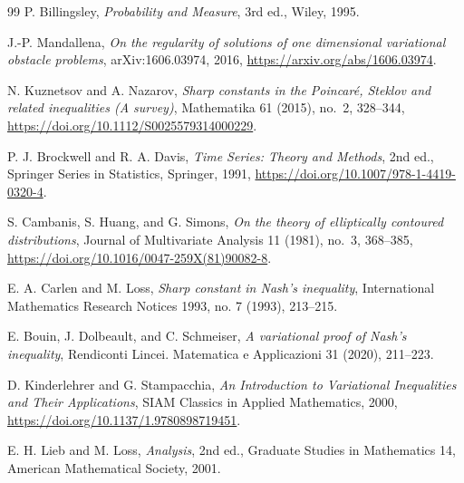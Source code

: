 \documentclass[11pt]{article}
\theoremstyle{definition}
\theoremstyle{remark}
\begin{document}
\begin{thebibliography}{99}
P. Billingsley, \emph{Probability and Measure}, 3rd ed., Wiley, 1995.

J.-P. Mandallena,
\emph{On the regularity of solutions of one dimensional variational obstacle problems},
arXiv:1606.03974, 2016,
\url{https://arxiv.org/abs/1606.03974}.

N. Kuznetsov and A. Nazarov,
\emph{Sharp constants in the Poincaré, Steklov and related inequalities (A survey)},
Mathematika 61 (2015), no.~2, 328--344,
\url{https://doi.org/10.1112/S0025579314000229}.

P. J. Brockwell and R. A. Davis,
\emph{Time Series: Theory and Methods}, 2nd ed.,
Springer Series in Statistics, Springer, 1991,
\url{https://doi.org/10.1007/978-1-4419-0320-4}.

S. Cambanis, S. Huang, and G. Simons,
\emph{On the theory of elliptically contoured distributions},
Journal of Multivariate Analysis 11 (1981), no.~3, 368--385,
\url{https://doi.org/10.1016/0047-259X(81)90082-8}.

E. A. Carlen and M. Loss,
\emph{Sharp constant in Nash's inequality},
International Mathematics Research Notices 1993, no. 7 (1993), 213--215.

E. Bouin, J. Dolbeault, and C. Schmeiser,
\emph{A variational proof of Nash's inequality},
Rendiconti Lincei. Matematica e Applicazioni 31 (2020), 211--223.

D. Kinderlehrer and G. Stampacchia,
\emph{An Introduction to Variational Inequalities and Their Applications},
SIAM Classics in Applied Mathematics, 2000,
\url{https://doi.org/10.1137/1.9780898719451}.

E. H. Lieb and M. Loss,
\emph{Analysis}, 2nd ed., Graduate Studies in Mathematics 14,
American Mathematical Society, 2001.
\end{thebibliography}
\end{document}
